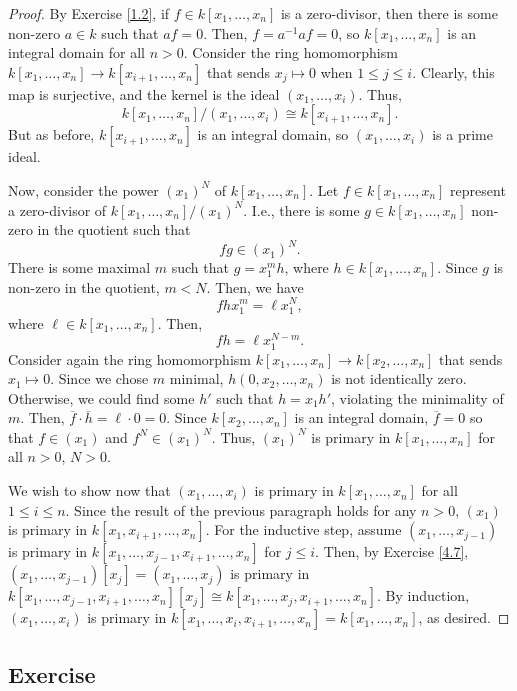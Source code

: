 \begin{proof}
By Exercise \ref{1.2}, if $f \in k[x_1,\ldots,x_n]$ is a zero-divisor, then there is some non-zero $a \in k$ such that $af=0$. Then, $f = a^{-1}af = 0$, 
so $k[x_1,\ldots,x_n]$ is an integral domain for all $n > 0$. Consider the ring homomorphism $k[x_1,\ldots,x_n] \to k[x_{i+1},\ldots,x_n]$ that sends $x_j \mapsto 0$
when $1 \le j \le i$. Clearly, this map is surjective, and the kernel is the ideal $(x_1,\ldots,x_i)$. Thus, 
$$k[x_1,\ldots,x_n]/(x_1,\ldots,x_i) \cong k[x_{i+1},\ldots,x_n].$$
But as before, $k[x_{i+1},\ldots,x_n]$ is an integral domain, so $(x_1,\ldots,x_i)$ is a prime ideal.

Now, consider the power $(x_1)^N$ of $k[x_1,\ldots,x_n]$. Let $f \in k[x_1,\ldots,x_n]$ represent a zero-divisor of $k[x_1,\ldots,x_n]/(x_1)^N$. I.e., there is some $g \in k[x_1,\ldots,x_n]$ non-zero in the
quotient such that
$$fg \in (x_1)^N.$$
There is some maximal $m$ such that $g = x_1^m h$, where $h \in k[x_1,\ldots,x_n]$. Since $g$ is non-zero in the quotient, $m < N$. Then, we have
$$fh x_1^m = \ell x_1^N,$$
where $\ell \in k[x_1,\ldots,x_n]$. Then,
$$fh = \ell x_1^{N-m}.$$
Consider again the ring homomorphism $k[x_1,\ldots,x_n] \to k[x_2,\ldots,x_n]$ that sends $x_1 \mapsto 0$. Since we chose $m$ minimal, $h(0,x_2,\ldots,x_n)$ is not identically zero. Otherwise, we could find
some $h'$ such that $h = x_1 h'$, violating the minimality of $m$. Then, $\overline{f} \cdot \overline{h} = \ell \cdot 0 = 0$. Since $k[x_2,\ldots,x_n]$ is an integral domain, $\overline{f} = 0$ so that
$f \in (x_1)$ and $f^N \in (x_1)^N$. Thus, $(x_1)^N$ is primary in $k[x_1,\ldots,x_n]$ for all $n > 0$, $N > 0$.

We wish to show now that $(x_1,\ldots,x_i)$ is primary in $k[x_1,\ldots,x_n]$ for all $1 \le i \le n$. Since the result of the previous paragraph holds for any $n > 0$, $(x_1)$ is primary in $k[x_1,x_{i+1},\ldots,x_n]$.
For the inductive step, assume $(x_1,\ldots,x_{j-1})$ is primary in $k[x_1,\ldots,x_{j-1},x_{i+1},\ldots,x_n]$ for $j \le i$. Then, by Exercise \ref{4.7}, $(x_1,\ldots,x_{j-1})[x_j] = (x_1,\ldots,x_j)$ is primary in
$k[x_1,\ldots,x_{j-1},x_{i+1},\ldots,x_n][x_j] \cong k[x_1,\ldots,x_j,x_{i+1},\ldots,x_n]$. By induction, $(x_1,\ldots,x_i)$ is primary in $k[x_1,\ldots, x_i,x_{i+1},\ldots,x_n] = k[x_1,\ldots,x_n]$, as desired.
\end{proof}

\subsection{Exercise}\label{4.9}

